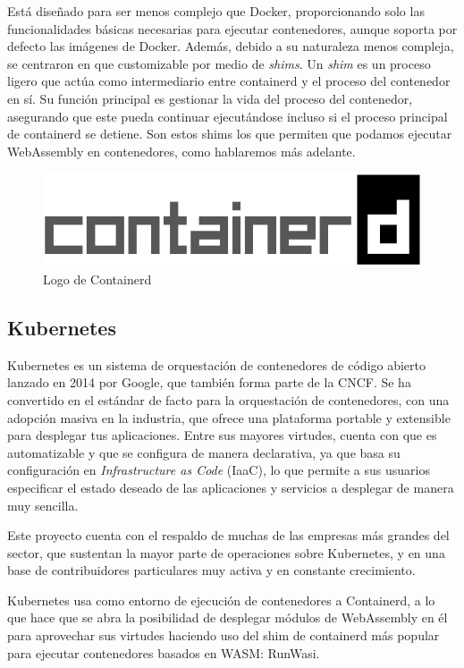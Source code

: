 Está diseñado para ser menos complejo que Docker, proporcionando solo las funcionalidades básicas necesarias para ejecutar contenedores, aunque soporta por defecto las imágenes de Docker. Además, debido a su naturaleza menos compleja, se centraron en que customizable por medio de \textit{shims}. Un \textit{shim} es un proceso ligero que actúa como intermediario entre containerd y el proceso del contenedor en sí. Su función principal es gestionar la vida del proceso del contenedor, asegurando que este pueda continuar ejecutándose incluso si el proceso principal de containerd se detiene. Son estos shims los que permiten que podamos ejecutar WebAssembly en contenedores, como hablaremos más adelante.

\begin{figure}[h!]
    \centering
    \includegraphics[width=0.5\linewidth]{figures/containerd-horizontal-color.png}
    \caption{Logo de Containerd}
    \label{fig:Containerd-Logo}
\end{figure}

\subsection{Kubernetes}

Kubernetes es un sistema de orquestación de contenedores de código abierto lanzado en 2014 por Google, que también forma parte de la CNCF. Se ha convertido en el estándar de facto para la orquestación de contenedores, con una adopción masiva en la industria, que ofrece una plataforma portable y extensible para desplegar tus aplicaciones. Entre sus mayores virtudes, cuenta con que es automatizable y que se configura de manera declarativa, ya que basa su configuración en \textit{Infrastructure as Code} (IaaC), lo que permite a sus usuarios especificar el estado deseado de las aplicaciones y servicios a desplegar de manera muy sencilla.

Este proyecto cuenta con el respaldo de muchas de las empresas más grandes del sector, que sustentan la mayor parte de operaciones sobre Kubernetes, y en una base de contribuidores particulares muy activa y en constante crecimiento.

Kubernetes usa como entorno de ejecución de contenedores a Containerd, a lo que hace que se abra la posibilidad de desplegar módulos de WebAssembly en él para aprovechar sus virtudes haciendo uso del shim de containerd más popular para ejecutar contenedores basados en WASM: RunWasi.

